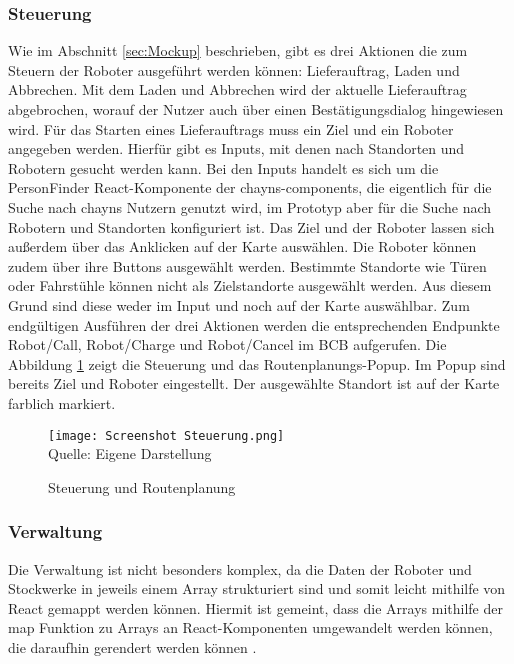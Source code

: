 \subsubsection{Steuerung}
Wie im Abschnitt \ref{sec:Mockup} beschrieben, gibt es drei Aktionen die zum Steuern der Roboter ausgeführt werden können: Lieferauftrag, Laden und Abbrechen. Mit dem Laden und Abbrechen wird der aktuelle Lieferauftrag abgebrochen, worauf der Nutzer auch über einen Bestätigungsdialog hingewiesen wird. Für das Starten eines Lieferauftrags muss ein Ziel und ein Roboter angegeben werden. Hierfür gibt es Inputs, mit denen nach Standorten und Robotern gesucht werden kann. Bei den Inputs handelt es sich um die PersonFinder React-Komponente \cite{ChaynsPersonFinder} der chayns-components, die eigentlich für die Suche nach chayns Nutzern genutzt wird, im Prototyp aber für die Suche nach Robotern und Standorten konfiguriert ist. Das Ziel und der Roboter lassen sich außerdem über das Anklicken auf der Karte auswählen. Die Roboter können zudem über ihre Buttons ausgewählt werden. Bestimmte Standorte wie Türen oder Fahrstühle können nicht als Zielstandorte ausgewählt werden. Aus diesem Grund sind diese weder im Input und noch auf der Karte auswählbar. Zum endgültigen Ausführen der drei Aktionen werden die entsprechenden Endpunkte Robot/Call, Robot/Charge und Robot/Cancel im \ac{BCB} \cite{BCBSwagger} aufgerufen. Die Abbildung \ref{fig:ControlsScreenshot} zeigt die Steuerung und das Routenplanungs-Popup. Im Popup sind bereits Ziel und Roboter eingestellt. Der ausgewählte Standort ist auf der Karte farblich markiert.

\begin{figure}[H]
    \caption{Steuerung und Routenplanung}\label{fig:ControlsScreenshot}
    \texttt{[image: Screenshot Steuerung.png]}
    \\
    Quelle: Eigene Darstellung
\end{figure}

\subsubsection{Verwaltung}
Die Verwaltung ist nicht besonders komplex, da die Daten der Roboter und Stockwerke in jeweils einem Array strukturiert sind und somit leicht mithilfe von React gemappt werden können. Hiermit ist gemeint, dass die Arrays mithilfe der map Funktion zu Arrays an React-Komponenten umgewandelt werden können, die daraufhin gerendert werden können \cite[S.~35-36]{Boduch2020}.

